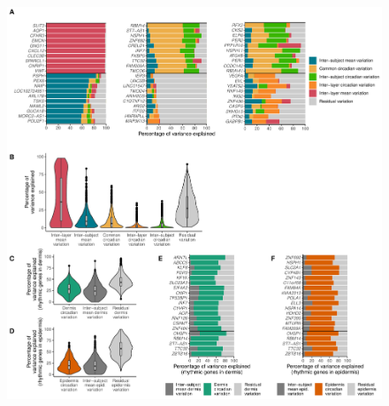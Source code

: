 \begin{figure}[b!]
	\begin{center}
		\includegraphics[scale=0.55]{./Figures/fig2.pdf}
		

\end{center}
\end{figure}
